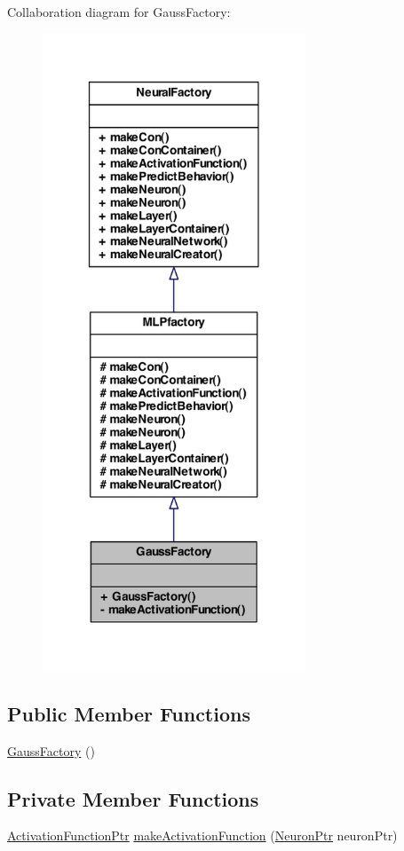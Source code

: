 Collaboration diagram for GaussFactory:
\nopagebreak
\begin{figure}[H]
\begin{center}
\leavevmode
\includegraphics[width=222pt]{class_gauss_factory__coll__graph}
\end{center}
\end{figure}
\subsection*{Public Member Functions}
\begin{DoxyCompactItemize}
\item 
\hyperlink{class_gauss_factory_ab6a0d29d7dc5fe78ebbaf6f2e37ec686}{GaussFactory} ()
\end{DoxyCompactItemize}
\subsection*{Private Member Functions}
\begin{DoxyCompactItemize}
\item 
\hyperlink{_a_m_o_r_e_8h_a77602a0277a02e5769c3df0adc669b17}{ActivationFunctionPtr} \hyperlink{class_gauss_factory_a0a937a783740366b0c07264f1d707ea7}{makeActivationFunction} (\hyperlink{_a_m_o_r_e_8h_ac1ea936c2c7728eb382278131652fef4}{NeuronPtr} neuronPtr)
\end{DoxyCompactItemize}


